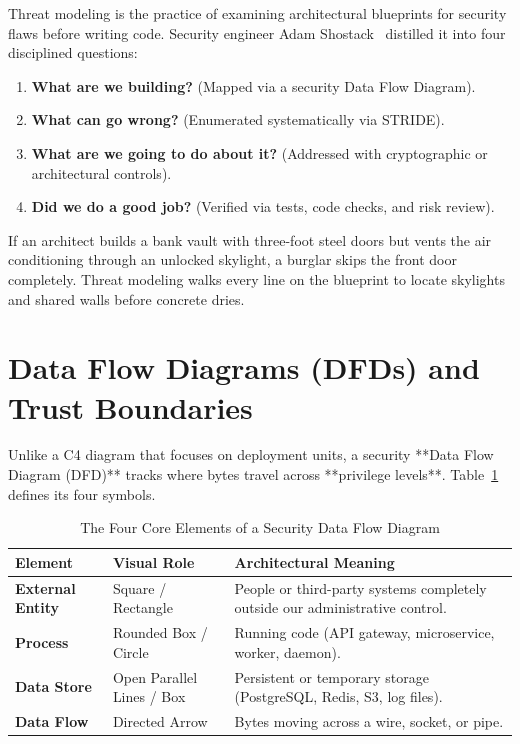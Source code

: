 Threat modeling is the practice of examining architectural blueprints for security flaws before writing code. Security engineer Adam Shostack~\cite{shostack2014threat} distilled it into four disciplined questions:
\begin{enumerate}[leftmargin=18pt]
  \item \textbf{What are we building?} (Mapped via a security Data Flow Diagram).
  \item \textbf{What can go wrong?} (Enumerated systematically via STRIDE).
  \item \textbf{What are we going to do about it?} (Addressed with cryptographic or architectural controls).
  \item \textbf{Did we do a good job?} (Verified via tests, code checks, and risk review).
\end{enumerate}

\begin{intuitionbox}
If an architect builds a bank vault with three-foot steel doors but vents the air conditioning through an unlocked skylight, a burglar skips the front door completely. Threat modeling walks every line on the blueprint to locate skylights and shared walls before concrete dries.
\end{intuitionbox}

\section{Data Flow Diagrams (DFDs) and Trust Boundaries}

Unlike a C4 diagram that focuses on deployment units, a security **Data Flow Diagram (DFD)** tracks where bytes travel across **privilege levels**. Table~\ref{tab:v5-ch04-dfd-elements} defines its four symbols.

\begin{table}[htbp]
\centering\small
\begin{tabular}{llp{7.5cm}}
\toprule
\textbf{Element} & \textbf{Visual Role} & \textbf{Architectural Meaning} \\
\midrule
\textbf{External Entity} & Square / Rectangle & People or third-party systems completely outside our administrative control. \\
\textbf{Process} & Rounded Box / Circle & Running code (API gateway, microservice, worker, daemon). \\
\textbf{Data Store} & Open Parallel Lines / Box & Persistent or temporary storage (PostgreSQL, Redis, S3, log files). \\
\textbf{Data Flow} & Directed Arrow & Bytes moving across a wire, socket, or pipe. \\
\bottomrule
\end{tabular}
\caption{The Four Core Elements of a Security Data Flow Diagram}
\label{tab:v5-ch04-dfd-elements}
\end{table}

